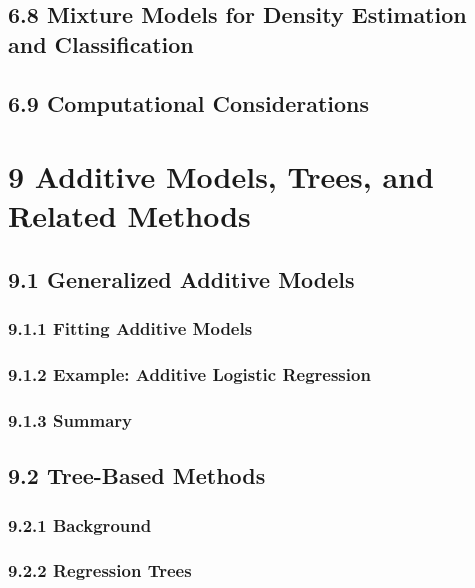 \documentclass[11pt]{article}
\begin{document}
\subsection{6.8 Mixture Models for Density Estimation and
Classification}\label{mixture-models-for-density-estimation-and-classification}

\subsection{6.9 Computational
Considerations}\label{computational-considerations}

    \section{9 Additive Models, Trees, and Related
Methods}\label{additive-models-trees-and-related-methods}

\subsection{9.1 Generalized Additive
Models}\label{generalized-additive-models}

\subsubsection{9.1.1 Fitting Additive
Models}\label{fitting-additive-models}

\subsubsection{9.1.2 Example: Additive Logistic
Regression}\label{example-additive-logistic-regression}

\subsubsection{9.1.3 Summary}\label{summary}

\subsection{9.2 Tree-Based Methods}\label{tree-based-methods}

\subsubsection{9.2.1 Background}\label{background}

\subsubsection{9.2.2 Regression Trees}\label{regression-trees}
\end{document}
